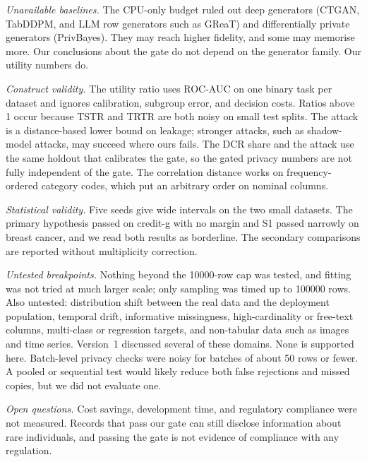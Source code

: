 \documentclass[journal]{IEEEtran}
\begin{document}
\emph{Unavailable baselines.} The CPU-only budget ruled out deep generators (CTGAN, TabDDPM, and LLM row generators such as GReaT) and differentially private generators (PrivBayes). They may reach higher fidelity, and some may memorise more. Our conclusions about the gate do not depend on the generator family. Our utility numbers do.

\emph{Construct validity.} The utility ratio uses ROC-AUC on one binary task per dataset and ignores calibration, subgroup error, and decision costs. Ratios above 1 occur because TSTR and TRTR are both noisy on small test splits. The attack is a distance-based lower bound on leakage; stronger attacks, such as shadow-model attacks, may succeed where ours fails. The DCR share and the attack use the same holdout that calibrates the gate, so the gated privacy numbers are not fully independent of the gate. The correlation distance works on frequency-ordered category codes, which put an arbitrary order on nominal columns.

\emph{Statistical validity.} Five seeds give wide intervals on the two small datasets. The primary hypothesis passed on credit-g with no margin and S1 passed narrowly on breast cancer, and we read both results as borderline. The secondary comparisons are reported without multiplicity correction.

\emph{Untested breakpoints.} Nothing beyond the 10000-row cap was tested, and fitting was not tried at much larger scale; only sampling was timed up to 100000 rows. Also untested: distribution shift between the real data and the deployment population, temporal drift, informative missingness, high-cardinality or free-text columns, multi-class or regression targets, and non-tabular data such as images and time series. Version~1 discussed several of these domains. None is supported here. Batch-level privacy checks were noisy for batches of about 50 rows or fewer. A pooled or sequential test would likely reduce both false rejections and missed copies, but we did not evaluate one.

\emph{Open questions.} Cost savings, development time, and regulatory compliance were not measured. Records that pass our gate can still disclose information about rare individuals, and passing the gate is not evidence of compliance with any regulation.
\end{document}
